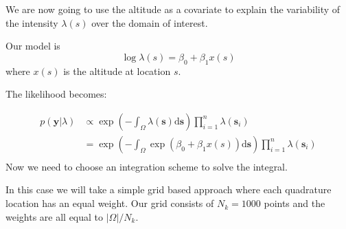 \documentclass[
  letterpaper,
  DIV=11,
  numbers=noendperiod]{scrartcl}
\newenvironment{Shaded}{\begin{snugshade}}{\end{snugshade}}
\newcommand{\AttributeTok}[1]{\textcolor[rgb]{0.40,0.45,0.13}{#1}}
\newcommand{\DecValTok}[1]{\textcolor[rgb]{0.68,0.00,0.00}{#1}}
\newcommand{\FunctionTok}[1]{\textcolor[rgb]{0.28,0.35,0.67}{#1}}
\newcommand{\NormalTok}[1]{\textcolor[rgb]{0.00,0.23,0.31}{#1}}
\newcommand{\OtherTok}[1]{\textcolor[rgb]{0.00,0.23,0.31}{#1}}
\newcommand{\SpecialCharTok}[1]{\textcolor[rgb]{0.37,0.37,0.37}{#1}}
\newcommand{\StringTok}[1]{\textcolor[rgb]{0.13,0.47,0.30}{#1}}
\begin{document}
We are now going to use the altitude as a covariate to explain the
variability of the intensity \(\lambda(s)\) over the domain of interest.

Our model is \[
\log\lambda(s) = \beta_0 + \beta_1x(s)
\] where \(x(s)\) is the altitude at location \(s\).

The likelihood becomes:

\[
\begin{aligned}
p(\mathbf{y} | \lambda)  & \propto \exp \left( -\int_\Omega \lambda(\mathbf{s}) \mathrm{d}\mathbf{s} \right) \prod_{i=1}^n \lambda(\mathbf{s}_i) \\
& = \exp \left( -\int_\Omega \exp(\beta_0 + \beta_1x(s)) \mathrm{d}\mathbf{s} \right) \prod_{i=1}^n \lambda(\mathbf{s}_i) \\
\end{aligned}
\] Now we need to choose an integration scheme to solve the integral.

In this case we will take a simple grid based approach where each
quadrature location has an equal weight. Our grid consists of
\(N_k = 1000\) points and the weights are all equal to \(|\Omega|/N_k\).

\begin{Shaded}
\end{Shaded}
\end{document}
